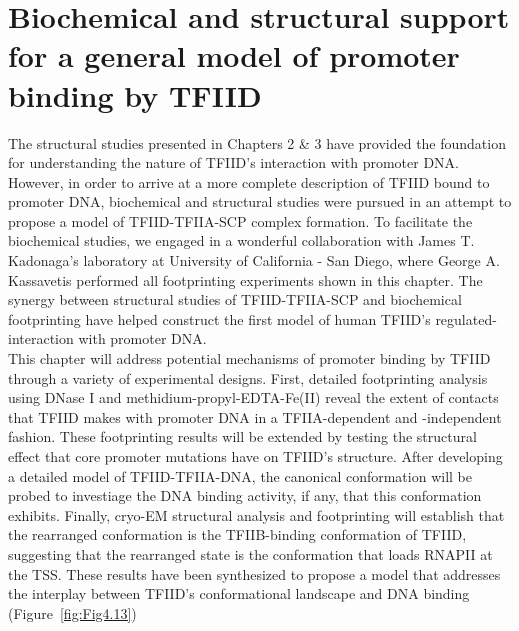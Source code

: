 \chapter{Biochemical and structural support for a general model of promoter binding by TFIID}

The structural studies presented in Chapters 2 \& 3 have provided the foundation for understanding the nature of TFIID's interaction with promoter DNA. However, in order to arrive at a more complete description of TFIID bound to promoter DNA, biochemical and structural studies were pursued in an attempt to propose a model of TFIID-TFIIA-SCP complex formation. To facilitate the biochemical studies, we engaged in a wonderful collaboration with James T. Kadonaga's laboratory at University of California - San Diego, where George A. Kassavetis performed all footprinting experiments shown in this chapter. The synergy between structural studies of TFIID-TFIIA-SCP and biochemical footprinting have helped construct the first model of human TFIID's regulated-interaction with promoter DNA.\\
\indent This chapter will address potential mechanisms of promoter binding by TFIID through a variety of experimental designs. First, detailed footprinting analysis using DNase I and methidium-propyl-EDTA-Fe(II) reveal the extent of contacts that TFIID makes with promoter DNA in a TFIIA-dependent and -independent fashion. These footprinting results will be extended by testing the structural effect that core promoter mutations have on TFIID's structure. After developing a detailed model of TFIID-TFIIA-DNA, the canonical conformation will be probed to investiage the DNA binding activity, if any, that this conformation exhibits. Finally, cryo-EM structural analysis and footprinting will establish that the rearranged conformation is the TFIIB-binding conformation of TFIID, suggesting that the rearranged state is the conformation that loads RNAPII at the TSS. These results have been synthesized to propose a model that addresses the interplay between TFIID's conformational landscape and DNA binding (Figure~\ref{fig:Fig4.13})
  
